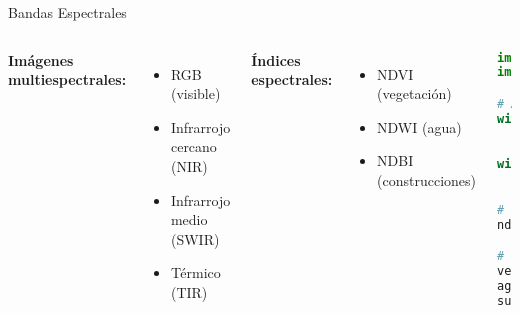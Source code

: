 \documentclass[10pt]{beamer}
\begin{document}
\begin{frame}[fragile]{Bandas Espectrales}
    \begin{columns}
        \textbf{Imágenes multiespectrales:}
        \begin{itemize}
            \item RGB (visible)
            \item Infrarrojo cercano (NIR)
            \item Infrarrojo medio (SWIR)
            \item Térmico (TIR)
        \end{itemize}
        
        \textbf{Índices espectrales:}
        \begin{itemize}
            \item NDVI (vegetación)
            \item NDWI (agua)
            \item NDBI (construcciones)
        \end{itemize}
        
        \begin{lstlisting}[language=Python, caption=Cálculo de NDVI]
import rasterio
import numpy as np

# Abrir bandas
with rasterio.open('B4_red.tif') as red:
    b4 = red.read(1).astype(float)
    
with rasterio.open('B5_nir.tif') as nir:
    b5 = nir.read(1).astype(float)

# Calcular NDVI
ndvi = (b5 - b4) / (b5 + b4 + 1e-10)

# Clasificar vegetación
vegetacion = ndvi > 0.3
agua = ndvi < 0
suelo = (ndvi >= 0) & (ndvi <= 0.3)
        \end{lstlisting}
    \end{columns}
\end{frame}
\end{document}
